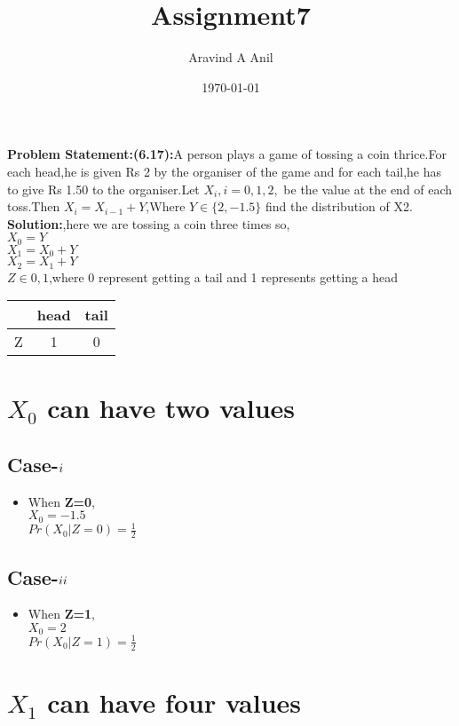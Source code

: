 \documentclass[11pt,a4paper,twocolumn]{article}
\title{Assignment7}
\author{Aravind A Anil}
\date{\today}
\begin{document}
\maketitle
\textbf{Problem Statement:(6.17):}A person plays a game of tossing a coin thrice.For each head,he is given Rs 2 by the organiser of the game and for each tail,he has to give Rs 1.50 to the organiser.Let $X_i,i=0,1,2,$ be the value at the end of each toss.Then $X_i=X_{i-1}+Y$,Where $Y\in\{2,-1.5\}$ find the distribution of X2.\\
\textbf{Solution:},here we are tossing a coin three times so,\\
$X_{0}=Y$\\
$X_{1}=X_{0}+Y$\\
$X_{2}=X_{1}+Y$\\
$Z\in{0,1}$,where 0 represent getting a tail and 1 represents getting a head
\begin{table}[ht]
    \centering
    \begin{tabular}{|c|c|c|}
\hline
     &head&tail  \\
     \hline
     Z&1&0\\
     \hline
\end{tabular}
\end{table}
\section{ $X_{0}$ can have two values}
    \subsection{Case-$\romannumeral1$}
\begin{itemize}
    \item When \textbf{Z=0},\\
    $X_{0}=-1.5$\\
$Pr(X_{0}|Z=0)=\frac{1}{2}$
\end{itemize}
\subsection{Case-$\romannumeral2$}
\begin{itemize}
    \item When \textbf{Z=1},\\
    $X_{0}=2$\\
    $Pr(X_{0}|Z=1)=\frac{1}{2}$
\end{itemize}
    \section{\textbf{$X_{1}$ can have four values}}
\end{document}
